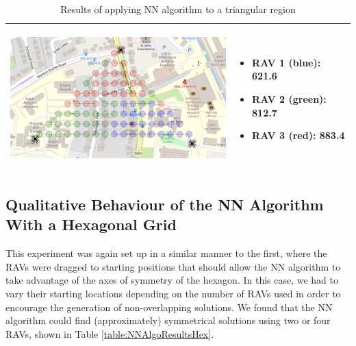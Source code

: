\begin{table}[H]
\begin{tabular}{ | c | m{5cm} | }
    \begin{minipage}[c][57mm][c]{.6\textwidth}
      \includegraphics[width=\linewidth, height=55mm]{Chapters/MultiAgentCoverage/MultipleTravellingSalesman/Figs/Triangle/ThreeRAV.PNG}
    \end{minipage}
    &
    \begin{itemize}[leftmargin=*]
    \item[] RAV 1 (blue): 621.6
    \item[] RAV 2 (green): 812.7
    \item[] RAV 3 (red): 883.4
    \end{itemize}
    \\
    \hline
  \end{tabular}
  \caption{Results of applying NN algorithm to a triangular region}\label{table:NNAlgoResultsTri}
\end{table}





\pagebreak
\subsection{Qualitative Behaviour of the NN Algorithm With a Hexagonal Grid}
This experiment was again set up in a similar manner to the first, where the RAVs were dragged to starting positions that should allow the NN algorithm to take advantage of the axes of symmetry of the hexagon. In this case, we had to vary their starting locations depending on the number of RAVs used in order to encourage the generation of non-overlapping solutions. We found that the NN algorithm could find (approximately) symmetrical solutions using two or four RAVs, shown in Table \ref{table:NNAlgoResultsHex}.



